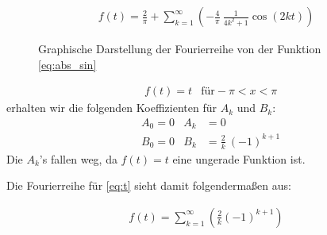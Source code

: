     \begin{align}
        f(t)=\frac{2}{\pi}+\sum_{k=1}^{\infty} \left(-\frac{4}{\pi} \:\frac{1}{4k^2+1} \cos(2kt)\right)
    \end{align}
    
    \begin{figure}[h]
         \centering
           \vspace{-1.5em}
         \caption{Graphische Darstellung der Fourierreihe von der Funktion \eqref{eq:abs_sin} \protect\footnotemark}
         \label{fig:sc_sin} 
    \end{figure}
\newpage
    \begin{align}
        &f(t) = t &\text{für} -\pi < x < \pi \label{eq:t}
    \end{align}
    erhalten wir die folgenden Koeffizienten für $A_k$ und $B_k$:
    \begin{align*}
        &A_0 = 0 &A_k &= 0\\
        &B_0 = 0 &B_k &= \frac{2}{k}\:(-1)^{k+1}
    \end{align*}
    Die $A_k$'s fallen weg, da $f(t)=t$ eine ungerade Funktion ist.

    Die Fourierreihe für \eqref{eq:t} sieht damit folgendermaßen aus:

    \begin{align}
        f(t)= \sum_{k=1}^{\infty} \left(\frac{2}{k} (-1)^{k+1}\right)
    \end{align}

